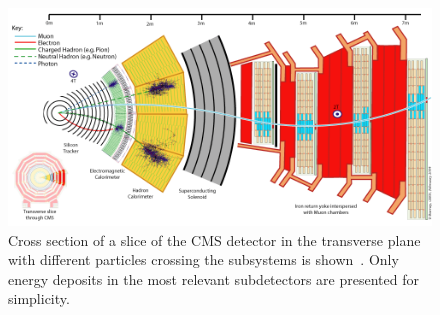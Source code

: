 \begin{figure}
\begin{center}
\includegraphics[width=\textwidth]{Plots/CMS/CMS_Slice}
\caption[Cross section of a slice of the CMS detector]{\label{fig:CMS_Slice} Cross section of a slice of the CMS detector in the transverse plane with different particles crossing the subsystems is shown~\cite{CMS_slice}. Only energy deposits in the most relevant subdetectors are presented for simplicity.}
\end{center}
\end{figure}
